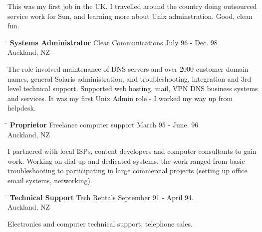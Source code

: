 \documentclass{res}
\begin{document}
\begin{resume}
	This was my first job in the UK.  I travelled around the country doing outsourced service work for Sun, and learning more about Unix adminstration.  Good, clean fun.
	  
	\begin{tabbing}
	   \hspace{2.3in}\= \hspace{2.6in}\= \kill %
	    {\bf Systems Administrator} \>Clear Communications \> July 96 - Dec. 98\\
	                          \>Auckland, NZ
		\end{tabbing}\vspace{-20pt}
	 The role involved maintenance of DNS servers and over 2000 customer domain names, general Solaris administration, and troubleshooting, integration and 3rd level technical support. Supported web hosting, mail, VPN DNS business systems and services. It was my first Unix Admin role - I worked my way up from helpdesk.
	
	\begin{tabbing}
	   \hspace{2.3in}\= \hspace{2.6in}\= \kill %
	    {\bf Proprietor} \>Freelance computer support \> March 95 - June. 96\\
	                          \>Auckland, NZ
	\end{tabbing}\vspace{-20pt}
	I partnered with local ISPs, content developers and computer consultants to gain work. Working on dial-up and dedicated systems, the work ranged from basic troubleshooting to participating in large commercial projects (setting up office email systems, networking).
	
	\begin{tabbing}
	   \hspace{2.3in}\= \hspace{2.6in}\= \kill %
	    {\bf Technical Support} \>Tech Rentals \> September 91 - April 94.\\
	                          \>Auckland, NZ
	\end{tabbing}\vspace{-20pt}
	Electronics and computer technical support, telephone sales.


\end{resume}
\end{document}

